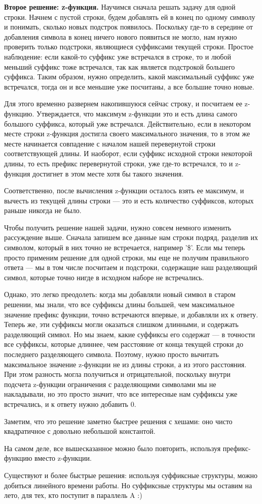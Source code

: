 \documentclass[12pt]{article}
\theoremstyle{definition}
\begin{document}
\textbf{Второе решение: z-функция.} Научимся сначала решать задачу для одной строки.
Начнем с пустой строки, будем добавлять ей в конец по одному символу и понимать,
сколько новых подстрок появилось. Поскольку где-то в середине от добавления символа в
конец ничего нового появиться не могло, нам нужно проверить только подстроки,
являющиеся суффиксами текущей строки. Простое наблюдение: если какой-то суффикс
уже встречался в строке, то и любой меньший суффикс тоже встречался, так как является
подстрокой большего суффикса. Таким образом, нужно определить, какой максимальный
суффикс уже встречался, тогда он и все меньшие уже посчитаны, а все большие точно новые.

Для этого временно развернем накопившуюся сейчас строку, и посчитаем ее z-функцию.
Утверждается, что максимум z-функции это и есть длина самого большого суффикса, который
уже встречался. Действительно, если в некотором месте строки z-функция достигла своего
максимального значения, то в этом же месте начинается совпадение с началом нашей
перевернутой строки соответствующей длины. И наоборот, если суффикс исходной строки
некоторой длины, то есть префикс перевернутой строки, уже где-то встречался,
то и z-функция достигнет в этом месте хотя бы такого значения.

Соответственно, после вычисления z-функции осталось взять ее максимум, и вычесть из текущей длины строки --- это и есть количество суффиксов, которых раньше никогда не было.

Чтобы получить решение нашей задачи, нужно совсем немного изменить рассуждение выше.
Сначала запишем все данные нам строки подряд, разделив их символом, который в них точно
не встречается, например '\$'. Если мы теперь просто применим решение для одной строки,
мы еще не получим правильного ответа --- мы в том числе посчитаем и подстроки,
содержащие наш разделяющий символ, которые точно нигде в исходном наборе не встречались.

Однако, это легко преодолеть: когда мы добавляли новый символ в старом решении, мы
знали, что все суффиксы длины большей, чем максимальное значение префикс функции,
точно встречаются впервые, и добавляли их к ответу. Теперь же, эти суффиксы могли
оказаться слишком длинными, и содержать разделяющий символ. Но мы знаем, какие суффиксы его содержат --- в точности все суффиксы, которые длиннее, чем расстояние от
конца текущей строки до последнего разделяющего символа. Поэтому, нужно просто
вычитать максимальное значение z-функции не из длины строки, а из этого расстояния.
При этом разность могла получиться и отрицательной, поскольку внутри подсчета z-функции
ограничения с разделяющими символами мы не накладывали, но это просто
значит, что все интересные нам суффиксы уже встречались, и к ответу нужно добавить 0.

Заметим, что это решение заметно быстрее решения с хешами: оно чисто квадратичное
с довольно небольшой константой.

На самом деле, все вышесказанное можно было повторить,
используя префикс-функцию вместо z-функции.

Существуют и более быстрые решения: используя суффиксные структуры, можно добиться
линейного времени работы. Но суффиксные структуры мы оставим на лето,
для тех, кто поступит в параллель A :)
\end{document}
